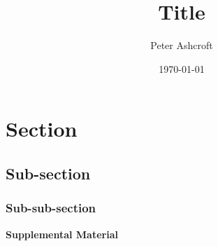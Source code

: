 \documentclass[onecolumn,amsmath,amssymb,11pt,a4paper,nofootinbib,showkeys,aps,rmp,superscriptaddress]{revtex4-1}
\begin{document}
\title{Title}
\author{Peter Ashcroft}

\date{\today}

\maketitle


\section{Section}
\label{sec:}

\subsection*{Sub-section}
\label{sec:sec:}

\subsubsection*{Sub-sub-section}
\label{sec:sec:sec:}






\widetext
\clearpage

\begin{center}
\textbf{\large Supplemental Material}
\end{center}
\setcounter{section}{0}
\setcounter{equation}{0}
\setcounter{figure}{0}
\setcounter{table}{0}
\makeatletter
\renewcommand{\thesection}{S.\Roman{section}}
\renewcommand{\theequation}{S\arabic{equation}}
\renewcommand{\thefigure}{S\arabic{figure}}
\renewcommand{\thetable}{S\arabic{table}}
\renewcommand{\bibnumfmt}[1]{[S#1]}
\renewcommand{\citenumfont}[1]{S#1}
\end{document}

